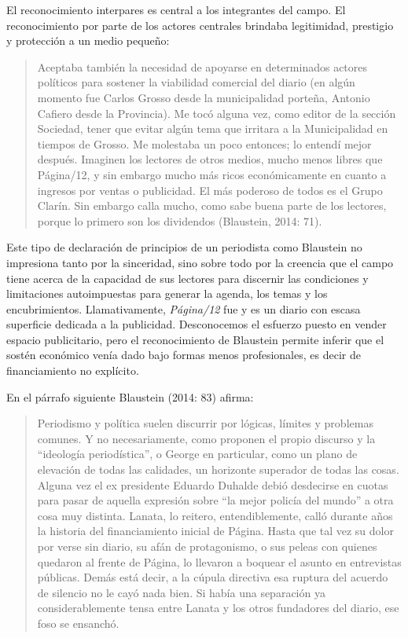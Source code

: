 El reconocimiento interpares es central a los integrantes del campo. El reconocimiento por parte de los actores centrales brindaba legitimidad, prestigio y protección a un medio pequeño:

\begin{quote}
Aceptaba también la necesidad de apoyarse en determinados actores políticos para sostener la viabilidad comercial del diario (en algún momento fue Carlos Grosso desde la municipalidad porteña, Antonio Cafiero desde la Provincia). Me tocó alguna vez, como editor de la sección Sociedad, tener que evitar algún tema que irritara a la Municipalidad en tiempos de Grosso. Me molestaba un poco entonces; lo entendí mejor después. Imaginen los lectores de otros medios, mucho menos libres que Página/12, y sin embargo mucho más ricos económicamente en cuanto a ingresos por ventas o publicidad. El más poderoso de todos es el Grupo Clarín. Sin embargo calla mucho, como sabe buena parte de los lectores, porque lo primero son los dividendos (Blaustein, 2014: 71).
\end{quote}

Este tipo de declaración de principios de un periodista como Blaustein no impresiona tanto por la sinceridad, sino sobre todo por la creencia que el campo tiene acerca de la capacidad de sus lectores para discernir las condiciones y limitaciones autoimpuestas para generar la agenda, los temas y los encubrimientos. Llamativamente, \emph{Página/12} fue y es un diario con escasa superficie dedicada a la publicidad. Desconocemos el esfuerzo puesto en vender espacio publicitario, pero el reconocimiento de Blaustein permite inferir que el sostén económico venía dado bajo formas menos profesionales, es decir de financiamiento no explícito.

En el párrafo siguiente Blaustein (2014: 83) afirma:

\begin{quote}
Periodismo y política suelen discurrir por lógicas, límites y problemas comunes. Y no necesariamente, como proponen el propio discurso y la ``ideología periodística'', o George en particular, como un plano de elevación de todas las calidades, un horizonte superador de todas las cosas. Alguna vez el ex presidente Eduardo Duhalde debió desdecirse en cuotas para pasar de aquella expresión sobre ``la mejor policía del mundo'' a otra cosa muy distinta. Lanata, lo reitero, entendiblemente, calló durante años la historia del financiamiento inicial de Página. Hasta que tal vez su dolor por verse sin diario, su afán de protagonismo, o sus peleas con quienes quedaron al frente de Página, lo llevaron a boquear el asunto en entrevistas públicas. Demás está decir, a la cúpula directiva esa ruptura del acuerdo de silencio no le cayó nada bien. Si había una separación ya considerablemente tensa entre Lanata y los otros fundadores del diario, ese foso se ensanchó.
\end{quote}

